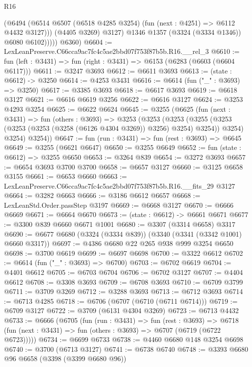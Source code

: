 \begin{lexlean}{R16}
\begin{coremodule}
                  (@6494
                    (@6514 @6507 (@6518 @4285 @3254) (fun (next : @4251) => @6112 @4432 @3127)))
                  (@4405 @3269)
                  @3127)
                @1346
                @1357
                (@3324 (@3334 @1346))
                @6080
                @6102)))))
      @6360)
@6604 := LexLeanPreserve.C66cca9ac7fc4c5ae2bbd07f753f87b5b.R16.__rel_3
@6610 := fun (left : @3431) => fun (right : @3431) => @6153 (@6283 (@6603 (@6604 @6117)))
@6611 := @3247 @3693
@6612 := @6611 @3693
@6613 := (state : @6612) -> @3250
@6614 := @4253 @3431
@6616 := @6614 (fun ("_" : @3693) => @3250)
@6617 := @3385 @3693
@6618 := @6617 @3693
@6619 := @6618 @3127
@6621 := @6616 @6619 @3256
@6622 := @6616 @3127
@6624 := @3253 @4293 @3254
@6625 := @6622 @6624
@6645 := @3255
    (@6625
      (fun (next : @3431) =>
      fun (others : @3693) =>
      @3253
        (@3253
          (@3253
            (@3255 (@3253 (@3253 (@3253 (@3258 (@6126 @4304 @3269)) @3256) @3254) @3254))
            @3254)
          @3254)
        @3254))
@6647 := fun (run : @3431) => fun (rest : @3693) => @6645
@6649 := @3255 (@6621 @6647)
@6650 := @3255 @6649
@6652 := fun (state : @6612) => @3255 @6650
@6653 := @3264 @839
@6654 := @3272 @3693
@6657 := @6654 @3693 @3700 @3700
@6658 := @6657 @3127
@6660 := @3125 @6658 @3155
@6661 := @6653 @6660
@6663 := LexLeanPreserve.C66cca9ac7fc4c5ae2bbd07f753f87b5b.R16.__fits_29 @3127
@6664 := @3282 @6663
@6666 := @3186 @6612 @6657
@6668 := LexLeanStd.Order.passStep @3197
@6669 := @6668 @3127
@6670 := @6666 @6669
@6671 := @6664 @6670
@6673 := (state : @6612) -> @6661 @6671
@6677 := @3300 @839 @6660 @6671 @1001
@6680 := @3307 (@3314 @6658) @3317
@6690 := @6677 @6680 (@3324 (@3334 @839)) (@3340 (@3341 (@3342 @1001) @6660 @3317))
@6697 := @4386 @6680 @22 @265 @938 @999 @3254 @6650
@6698 := @3700 @6619
@6699 := @6697 @6698
@6700 := @3322 @6612
@6702 := @6614 (fun ("_" : @3693) => @6700)
@6703 := @6702 @6619
@6704 := @4401 @6612
@6705 := @6703 @6704
@6706 := @6702 @3127
@6707 := @4404 @6612
@6708 := @3308 @3693
@6709 := @6708 @3693
@6710 := @6709 @3799
@6711 := @3709 @3269
@6712 := @3288 @3693
@6713 := @6712 @3693
@6714 := @6713 @4285
@6718 := @6706 (@6707 (@6710 (@6711 @6714)))
@6719 := @6709 @3127
@6722 := @3709 (@6131 @4304 @3269)
@6723 := @6713 @4432
@6733 := @6666
    (@6705
      (fun (run : @3431) =>
      fun (rest : @3693) =>
      @6718 (fun (next : @3431) => fun (others : @3693) => @6707 (@6719 (@6722 @6723)))))
@6734 := @6699 @6733
@6738 := @4460 @6680 @148 @3254 @6698
@6740 := @3700 (@6713 @3127)
@6741 := @6738 @6740
@6748 := @3393 @6680 @96 @6658 (@3398 (@3399 @6680 @96))

\end{coremodule}
\end{lexlean}

